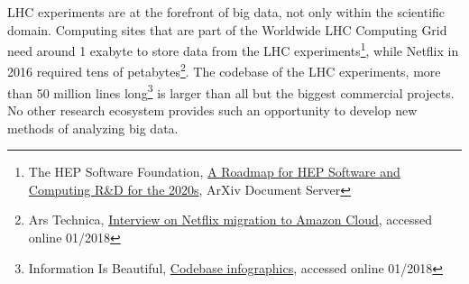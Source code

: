 LHC experiments are at the forefront of big data, not only within the scientific domain.
Computing sites that are part of the Worldwide LHC Computing Grid need around 1 exabyte
to store data from the LHC experiments\footnote{The HEP Software Foundation, \href{https://arxiv.org/pdf/1712.06982.pdf}{A Roadmap for HEP Software and Computing R\&D for the 2020s}, ArXiv Document Server}, while Netflix in 2016 required 
tens of petabytes\footnote{Ars Technica, \href{https://arstechnica.com/information-technology/2016/02/netflix-finishes-its-massive-migration-to-the-amazon-cloud/}{Interview on Netflix migration to Amazon Cloud}, accessed online 01/2018}. 
The codebase of the LHC experiments, 
more than 50 million lines long\footnote{Information Is Beautiful, \href{http://www.informationisbeautiful.net/visualizations/million-lines-of-code/}{Codebase infographics}, accessed online 01/2018} 
is larger than all but the biggest commercial projects.  
No other research ecosystem provides such an opportunity to develop new methods
of analyzing big data. 

